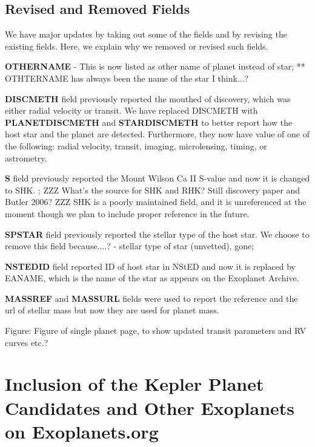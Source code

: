 \documentclass[11pt,preprint]{aastex}
\begin{document}
\begin{CJK*}{UTF8}{gbsn}
\subsection{Revised and Removed Fields}
We have major updates by taking out some of the fields and by revising the existing fields. Here, we explain why we removed or revised such fields. 

{\bf OTHERNAME} - This is now listed as other name of planet instead of star;
** OTHTERNAME has always been the name of the star I think...?

{\bf DISCMETH} field previously reported the mouthed of discovery, which was either radial velocity or transit. We have replaced DISCMETH with {\bf PLANETDISCMETH} and {\bf STARDISCMETH} to better report how the host star and the planet are detected. Furthermore, they now have value of one of the following: radial velocity, transit, imaging, microlensing, timing, or astrometry.  

{\bf S} field previously reported the Mount Wilson Ca II S-value and now it is changed to SHK. 
; ZZZ What's the source for SHK and RHK? Still discovery paper and Butler 2006? ZZZ SHK is a poorly maintained field, and it is unreferenced at the moment though we plan to include proper reference
in the future.

{\bf SPSTAR} field previously reported the stellar type of the host star. We choose to remove this field because....? - stellar type of star (unvetted), gone;

{\bf NSTEDID} field reported ID of host star in NStED and now it is replaced by EANAME, which is the name of the star as appears on the Exoplanet Archive. 

{\bf MASSREF} and {\bf MASSURL} fields were used to report the reference and the url of stellar mass but now they are used for planet mass.

Figure: Figure of single planet page, to show updated transit
parameters and RV curves etc.?


\section{Inclusion of the Kepler Planet Candidates and Other Exoplanets on Exoplanets.org}\label{sec:kepler}


\end{CJK*}
\end{document}
